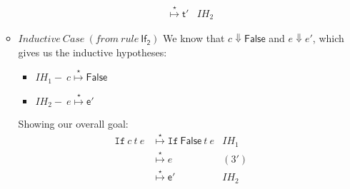 \documentclass[a4paper,answers]{exam}
\newcommand{\mapstos}[0]{\stackrel{\star}{\mapsto}}
\begin{document}
\begin{itemize}
\begin{solution}
\begin{itemize}[leftmargin=*]
\begin{align*}
            \quad &\mapstos \mathsf{t'} & IH_2
        \end{align*}
        \small\item[] $Inductive\ Case\ (from\ rule\ \mathsf{If_2})$ We know that $c \Downarrow \mathsf{False}$ and $e \Downarrow e'$, which gives us the inductive hypotheses:
        \begin{itemize}
            \item[\bullet] $IH_1 -\ c\mapstos \mathsf{False}$
            \item[\bullet] $IH_2 -\ e\mapstos \mathsf{e'}$
        \end{itemize}
        Showing our overall goal:
        \normalsize\begin{align*}
            \texttt{If}\ c\ t\ e &\mapstos \texttt{If}\ \mathsf{False}\ t\ e & IH_1\\
            \quad &\mapstos e & (3')\\
            \quad &\mapstos \mathsf{e'} & IH_2\\
        \end{align*}
    \end{itemize}
\end{solution}
\end{itemize}


\newpage
\end{document}
